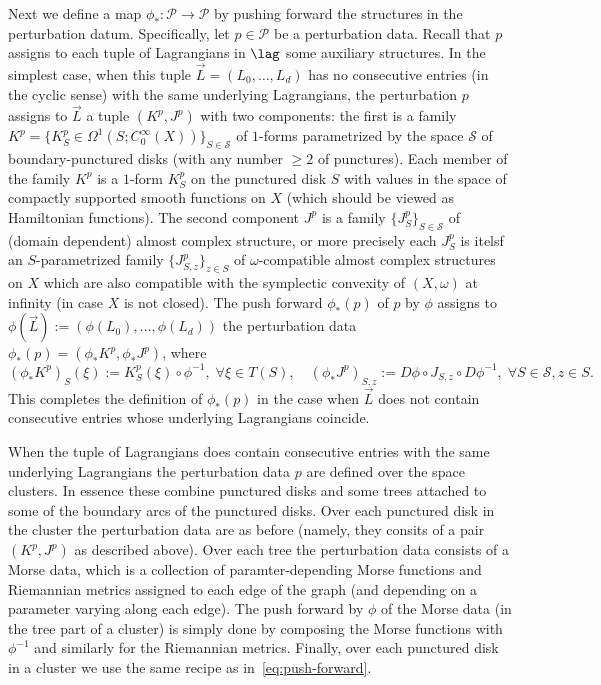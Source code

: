 Next we define a map
$\phi_* : \mathcal{P} \longrightarrow \mathcal{P}$ by pushing forward
the structures in the perturbation datum. Specifically, let
$p \in \mathcal{P}$ be a perturbation data. Recall that $p$ assigns to
each tuple of Lagrangians in $\lag$ some auxiliary structures.  In the
simplest case, when this tuple $\vec{L} = (L_0, \ldots, L_d)$ has no
consecutive entries (in the cyclic sense) with the same underlying
Lagrangians, the perturbation $p$ assigns to $\vec{L}$ a tuple
$(K^p, J^p)$ with two components: the first is a family
$K^p =\{K^p_S \in \Omega^1(S; C_0^{\infty}(X))\}_{S \in \mathcal{S}}$
of $1$-forms parametrized by the space $\mathcal{S}$ of
boundary-punctured disks (with any number $\geq 2$ of punctures). Each
member of the family $K^p$ is a $1$-form $K_S^p$ on the punctured disk
$S$ with values in the space of compactly supported smooth functions
on $X$ (which should be viewed as Hamiltonian functions). The second
component $J^p$ is a family $\{J_S^p\}_{S \in \mathcal{S}}$ of (domain
dependent) almost complex structure, or more precisely each $J^p_S$ is
itelsf an $S$-parametrized family $\{J^p_{S,z}\}_{z \in S}$ of
$\omega$-compatible almost complex structures on $X$ which are also
compatible with the symplectic convexity of $(X, \omega)$ at infinity
(in case $X$ is not closed).  The push forward $\phi_*(p)$ of $p$ by
$\phi$ assigns to $\phi(\vec{L}) := (\phi(L_0), \ldots, \phi(L_d))$
the perturbation data $\phi_*(p) = (\phi_* K^p, \phi_* J^p)$, where
\begin{equation} \label{eq:push-forward}
  (\phi_*K^p)_S (\xi) :=  K^p_S(\xi) \circ \phi^{-1}, \; \forall
  \xi \in T(S), \quad (\phi_* J^p)_{S,z} := D \phi \circ J_{S,z}
  \circ D \phi^{-1}, \; \forall S \in \mathcal{S}, z \in S.
\end{equation}
This completes the definition of $\phi_*(p)$ in the case when
$\vec{L}$ does not contain consecutive entries whose underlying
Lagrangians coincide.

When the tuple of Lagrangians does contain consecutive entries with
the same underlying Lagrangians the perturbation data $p$ are defined
over the space clusters. In essence these combine punctured disks
and some trees attached to some of the boundary arcs of the punctured
disks. Over each punctured disk in the cluster the perturbation data
are as before (namely, they consits of a pair $(K^p,J^p)$ as described
above). Over each tree the perturbation data consists of a Morse data,
which is a collection of paramter-depending Morse functions and
Riemannian metrics assigned to each edge of the graph (and depending
on a parameter varying along each edge). The push forward by $\phi$
of the Morse data (in the tree part of a cluster) is simply done by
composing the Morse functions with $\phi^{-1}$ and similarly for the
Riemannian metrics. Finally, over each punctured disk in a cluster we
use the same recipe as in~\eqref{eq:push-forward}.

